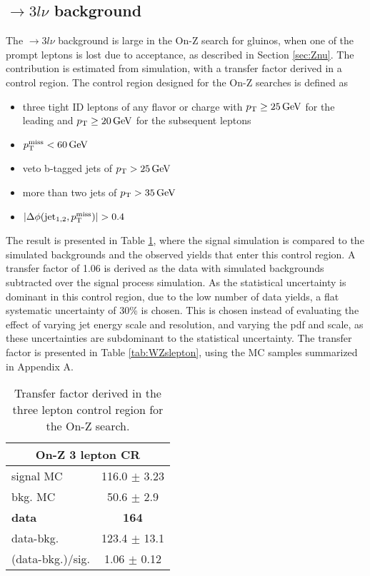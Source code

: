 \subsection*{\PWZ$\rightarrow3l\nu$ background}\label{sec:Znustrong}
\noindent\justify
The \PWZ$\rightarrow3l\nu$ background is large in the On-Z search for gluinos, when one of the prompt leptons is lost due to acceptance, as described in Section \ref{sec:Znu}. 
The contribution is estimated from simulation, with a transfer factor derived in a \PWZ control region. 
The \PWZ control region designed for the On-Z searches is defined as
\begin{itemize}
    \item three tight ID leptons of any flavor or charge with $p_{\mathrm{T}}\geq25\,\text{Ge\hspace{-.08em}V}$ for the leading and $p_{\mathrm{T}}\geq20\,\text{Ge\hspace{-.08em}V}$ for the subsequent leptons
    \item $p_{\mathrm{T}}^\text{miss}<60\,\text{Ge\hspace{-.08em}V}$
    \item veto b-tagged jets of $p_{\mathrm{T}}>25\,\text{Ge\hspace{-.08em}V}$
    \item more than two jets of $p_{\mathrm{T}}>35\,\text{Ge\hspace{-.08em}V}$
    \item $|\Delta\phi(\mathrm{jet_{1,2}}, \ptmiss)|>0.4$
\end{itemize}
\newpara
\noindent\justify
The result is presented in Table \ref{tab:WZonZ}, where the \PWZ signal simulation is compared to the simulated backgrounds and the observed yields that enter this control region.
A transfer factor of 1.06 is derived as the data with simulated backgrounds subtracted over the signal process simulation.
As the statistical uncertainty is dominant in this control region, due to the low number of data yields, a flat systematic uncertainty of 30\% is chosen.
This is chosen instead of evaluating the effect of varying jet energy scale and resolution, and varying the pdf and scale, as these uncertainties are subdominant to the statistical uncertainty.
The transfer factor is presented in Table \ref{tab:WZslepton}, using the MC samples summarized in Appendix A.
\begin{table}[ht!]
\def\arraystretch{1.2}
\setlength{\belowcaptionskip}{6pt}
\small
\centering
\caption{Transfer factor derived in the three lepton control region for the On-Z search.}
\label{tab:WZonZ}
\begin{tabular}{l c }
\hline \hline
\multicolumn{2}{c}{On-Z 3 lepton CR}  \\\hline
signal MC        & 116.0     $\pm$  3.23    \\
bkg. MC          & 50.6  $\pm$  2.9\\ \hline
\textbf{data}       & \textbf{164}  \\
data-bkg.        &  123.4   $\pm$  13.1 \\ \hline
(data-bkg.)/sig. & 1.06   $\pm$  0.12\\ \hline\hline
\end{tabular}
\end{table}
